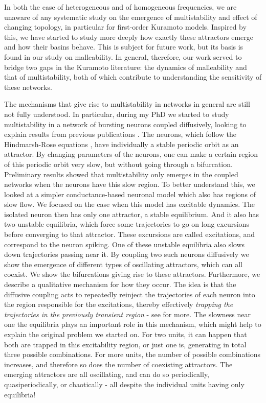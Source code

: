 In both the case of heterogeneous and of homogeneous frequencies, we are unaware of any systematic study on the emergence of multistability and effect of changing topology, in particular for first-order Kuramoto models. Inspired by this, we have started to study more deeply how exactly these attractors emerge and how their basins behave. This is subject for future work, but its basis is found in our study on malleability. In general, therefore, our work served to bridge two gaps in the Kuramoto literature: the dynamics of malleability and that of multistability, both of which contribute to understanding the sensitivity of these networks. 

The mechanisms that give rise to multistability in networks in general are still not fully understood. In particular, during my PhD we started to study multistability in a network of bursting neurons coupled diffusively, looking to explain results from previous publications \cite{rossi2021phase}. The neurons, which follow the Hindmarsh-Rose equations \cite{hindmarsh1984a}, have individually a stable periodic orbit as an attractor. By changing parameters of the neurons, one can make a certain region of this periodic orbit very slow, but without going through a bifurcation. Preliminary results showed that multistability only emerges in the coupled networks when the neurons have this slow region. To better understand this, we looked at a simpler conductance-based neuronal model \cite{izhikevichbook} which also has regions of slow flow. We focused on the case when this model has excitable dynamics. The isolated neuron then has only one attractor, a stable equilibrium. And it also has two unstable equilibria, which force some trajectories to go on long excursions before converging to that attractor. These excursions are called excitations, and correspond to the neuron spiking. One of these unstable equilibria also slows down trajectories passing near it. By coupling two such neurons diffusively we show the emergence of different types of oscillating attractors, which can all coexist. We show the bifurcations giving rise to these attractors. Furthermore, we describe a qualitative mechanism for how they occur. The idea is that the diffusive coupling acts to repeatedly reinject the trajectories of each neuron into the region responsible for the excitations, thereby effectively \textit{trapping the trajectories in the previously transient region} - see  for more. The slowness near one the equilibria plays an important role in this mechanism, which might help to explain the original problem we started on. For two units, it can happen that both are trapped in this excitability region, or just one is, generating in total three possible combinations. For more units, the number of possible combinations increases, and therefore so does the number of coexisting attractors. The emerging attractors are all oscillating, and can do so periodically, quasiperiodically, or chaotically - all despite the individual units having only equilibria!  
